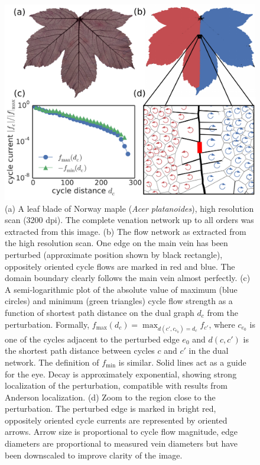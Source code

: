 \documentclass[10pt,aps,pra,twocolumn,superscriptaddress]{revtex4-1}
\begin{document}
\begin{figure}
    \includegraphics[width=.9\columnwidth]{pics/figure_simulations.pdf}
    \caption{(a) A leaf blade of Norway maple (\emph{Acer platanoides}),
    high resolution scan (3200 dpi). The complete venation network
    up to all orders was extracted from this image.
    (b) The flow network as extracted from the high resolution scan.
    One edge on the main vein has been perturbed (approximate position
    shown by black rectangle),
    oppositely oriented cycle flows are marked in red and blue.
    The domain boundary clearly follows the main vein almost perfectly.
    (c) A semi-logarithmic plot of the absolute value of maximum (blue
    circles) and minimum (green triangles) cycle flow strength as a 
    function of shortest path distance
    on the dual graph $d_c$ from the perturbation. Formally,
    $f_\mathrm{max}(d_c) = \operatorname{max}_{d(c', c_{e_0}) = d_c}
    f_{c'}$, where $c_{e_0}$ is one of the cycles adjacent to the 
    perturbed edge $e_0$ and $d(c,c')$ is the shortest path distance
    between cycles $c$ and $c'$ in the dual network. 
    The definition of $f_\mathrm{min}$ is similar.
    Solid lines act as a guide for the eye.
    Decay is approximately exponential, showing strong localization 
    of the perturbation,
    compatible with results from Anderson localization.
    (d) Zoom to the region close to the perturbation. The perturbed edge
    is marked in bright red, oppositely oriented cycle currents are
    represented by oriented arrows. Arrow size is proportional to
    cycle flow magnitude, edge diameters are proportional to measured
    vein diameters but have been downscaled to improve clarity of the
    image.
    \label{fig:vascular-network}}
\end{figure}
\end{document}
